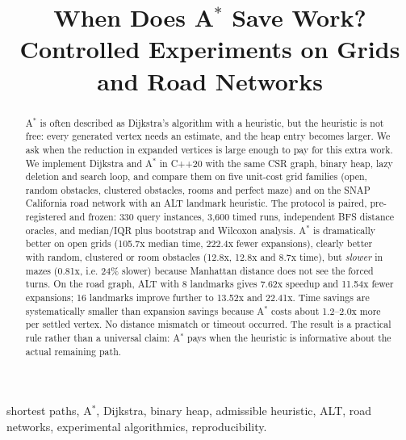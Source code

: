 \documentclass[conference,10pt]{IEEEtran}
\newcommand{\Astar}{A$^\ast$}
\begin{document}
\title{When Does \Astar{} Save Work?\\ Controlled Experiments on Grids and Road Networks}

\author{
}

\maketitle

\begin{abstract}
\Astar{} is often described as Dijkstra's algorithm with a heuristic, but the
heuristic is not free: every generated vertex needs an estimate, and the heap
entry becomes larger.  We ask when the reduction in expanded vertices is large
enough to pay for this extra work.  We implement Dijkstra and \Astar{} in C++20
with the same CSR graph, binary heap, lazy deletion and search loop, and compare
them on five unit-cost grid families (open, random obstacles, clustered
obstacles, rooms and perfect maze) and on the SNAP California road network with
an ALT landmark heuristic.  The protocol is paired, pre-registered and frozen:
330 query instances, 3,600 timed runs, independent BFS distance oracles, and
median/IQR plus bootstrap and Wilcoxon analysis.  \Astar{} is dramatically
better on open grids (105.7x median time, 222.4x fewer expansions), clearly
better with random, clustered or room obstacles (12.8x, 12.8x and 8.7x time),
but \emph{slower} in mazes (0.81x, i.e. 24\% slower) because Manhattan distance
does not see the forced turns.  On the road graph, ALT with 8 landmarks gives
7.62x speedup and 11.54x fewer expansions; 16 landmarks improve further to
13.52x and 22.41x.  Time savings are systematically smaller than expansion
savings because \Astar{} costs about 1.2--2.0x more per settled vertex.  No
distance mismatch or timeout occurred.  The result is a practical rule rather
than a universal claim: \Astar{} pays when the heuristic is informative about
the actual remaining path.
\end{abstract}

\begin{IEEEkeywords}
shortest paths, \Astar{}, Dijkstra, binary heap, admissible heuristic, ALT,
road networks, experimental algorithmics, reproducibility.
\end{IEEEkeywords}
\end{document}
